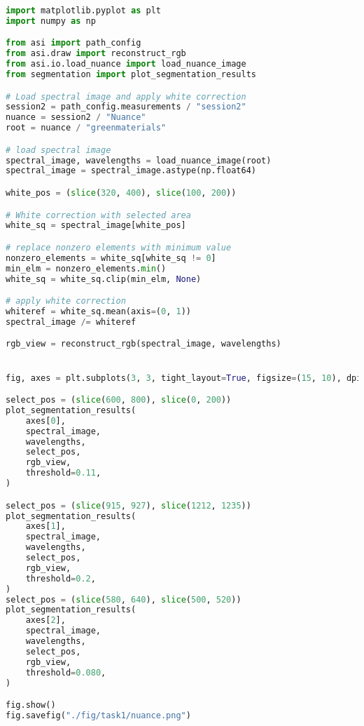 \begin{lstlisting}[language=python, caption=Segmentation of green materials by Nuance camera, label={code:green-nuance}]
import matplotlib.pyplot as plt
import numpy as np

from asi import path_config
from asi.draw import reconstruct_rgb
from asi.io.load_nuance import load_nuance_image
from segmentation import plot_segmentation_results

# Load spectral image and apply white correction
session2 = path_config.measurements / "session2"
nuance = session2 / "Nuance"
root = nuance / "greenmaterials"

# load spectral image
spectral_image, wavelengths = load_nuance_image(root)
spectral_image = spectral_image.astype(np.float64)

white_pos = (slice(320, 400), slice(100, 200))

# White correction with selected area
white_sq = spectral_image[white_pos]

# replace nonzero elements with minimum value
nonzero_elements = white_sq[white_sq != 0]
min_elm = nonzero_elements.min()
white_sq = white_sq.clip(min_elm, None)

# apply white correction
whiteref = white_sq.mean(axis=(0, 1))
spectral_image /= whiteref

rgb_view = reconstruct_rgb(spectral_image, wavelengths)


fig, axes = plt.subplots(3, 3, tight_layout=True, figsize=(15, 10), dpi=80)

select_pos = (slice(600, 800), slice(0, 200))
plot_segmentation_results(
    axes[0],
    spectral_image,
    wavelengths,
    select_pos,
    rgb_view,
    threshold=0.11,
)

select_pos = (slice(915, 927), slice(1212, 1235))
plot_segmentation_results(
    axes[1],
    spectral_image,
    wavelengths,
    select_pos,
    rgb_view,
    threshold=0.2,
)
select_pos = (slice(580, 640), slice(500, 520))
plot_segmentation_results(
    axes[2],
    spectral_image,
    wavelengths,
    select_pos,
    rgb_view,
    threshold=0.080,
)

fig.show()
fig.savefig("./fig/task1/nuance.png")

\end{lstlisting}